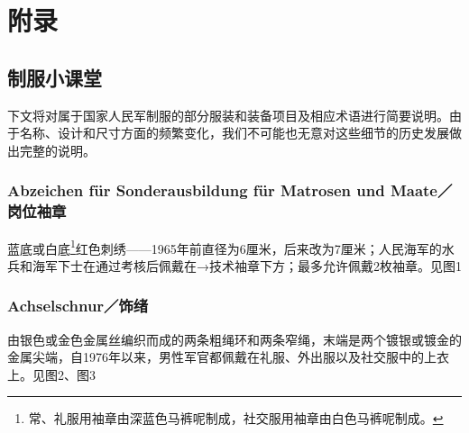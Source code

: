 \section*{附录}

\subsection*{制服小课堂}

下文将对属于国家人民军制服的部分服装和装备项目及相应术语进行简要说明。由于名称、设计和尺寸方面的频繁变化，我们不可能也无意对这些细节的历史发展做出完整的说明。

\subsubsection*{Abzeichen für Sonderausbildung für Matrosen und Maate／岗位袖章}

蓝底或白底\footnote{常、礼服用袖章由深蓝色马裤呢制成，社交服用袖章由白色马裤呢制成。\cite{clarionv}}红色刺绣——1965年前直径为6厘米，后来改为7厘米；人民海军的水兵和海军下士在通过考核后佩戴在→技术袖章下方；最多允许佩戴2枚袖章。见图1

\subsubsection*{Achselschnur／饰绪}%

由银色或金色金属丝编织而成的两条粗绳环和两条窄绳，末端是两个镀银或镀金的金属尖端，自1976年以来，男性军官都佩戴在礼服、外出服以及社交服中的上衣上。见图2、图3

